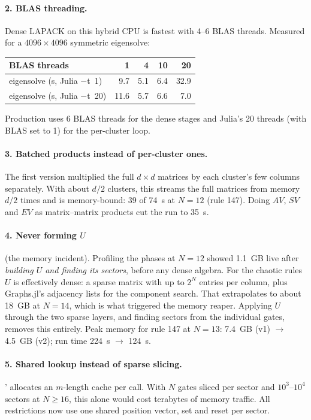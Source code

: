 \paragraph{2. BLAS threading.} Dense LAPACK on this hybrid CPU is fastest with 4--6 BLAS threads. Measured for a
$4096\times4096$ symmetric eigensolve:
\begin{center}\small
\begin{tabular}{lrrrr}
\toprule
BLAS threads & 1 & 4 & 10 & 20 \\
\midrule
eigensolve (s, Julia $-$t~1) & 9.7 & 5.1 & 6.4 & 32.9 \\
eigensolve (s, Julia $-$t~20) & 11.6 & 5.7 & 6.6 & 7.0 \\
\bottomrule
\end{tabular}
\end{center}
Production uses 6 BLAS threads for the dense stages and Julia's 20 threads (with BLAS set to 1) for the per-cluster loop.

\paragraph{3. Batched products instead of per-cluster ones.} The first version multiplied the full $d\times d$ matrices
by each cluster's few columns separately. With about $d/2$ clusters, this streams the full matrices from memory
$d/2$ times and is memory-bound: 39 of 74~s at $N=12$ (rule 147). Doing $AV$, $SV$ and $EV$ as matrix--matrix products
cut the run to 35~s.

\paragraph{4. Never forming $U$} (the memory incident). Profiling the phases at $N=12$ showed 1.1~GB live after
\emph{building $U$ and finding its sectors}, before any dense algebra. For the chaotic rules $U$ is effectively dense: a
sparse matrix with up to $2^N$ entries per column, plus Graphs.jl's adjacency lists for the component search. That
extrapolates to about 18~GB at $N=14$, which is what triggered the memory reaper. Applying $U$ through the two sparse
layers, and finding sectors from the individual gates, removes this entirely. Peak memory for rule 147 at $N=13$: 7.4~GB
(v1) $\to$ 4.5~GB (v2); run time 224~s $\to$ 124~s.

\paragraph{5. Shared lookup instead of sparse slicing.} '  allocates an $m$-length cache
per call. With $N$ gates sliced per sector and $10^3$--$10^4$ sectors at $N\ge16$, this alone would cost terabytes of
memory traffic. All restrictions now use one shared position vector, set and reset per sector.

